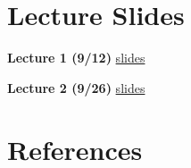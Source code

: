 \documentclass[]{book}
\theoremstyle{definition}
\theoremstyle{definition}
\theoremstyle{definition}
\theoremstyle{remark}
\begin{document}
\hypertarget{appendix-appendix}{%
\appendix}


\hypertarget{lecture-slides}{%
\chapter{Lecture Slides}\label{lecture-slides}}

\textbf{Lecture 1 (9/12)} \href{./lectures/lecture01/lec01_slides.html}{slides}

\textbf{Lecture 2 (9/26)} \href{./lectures/lecture02/lec02_slides.html}{slides}

\hypertarget{references}{%
\chapter*{References}\label{references}}


\end{document}
